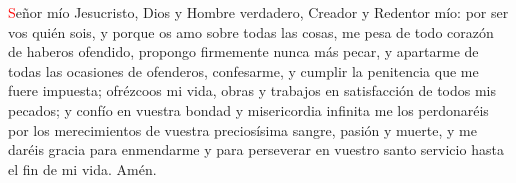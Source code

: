 \textcolor{red}{S}eñor mío Jesucristo, Dios y Hombre verdadero, Creador y Redentor mío: por ser vos quién sois, y porque os amo sobre todas las cosas,
me pesa de todo corazón de haberos ofendido, propongo firmemente nunca más pecar, y apartarme de todas las ocasiones de ofenderos,
confesarme, y cumplir la penitencia que me fuere impuesta; ofrézcoos mi vida, obras y trabajos en satisfacción de todos mis pecados;
y confío en vuestra bondad y misericordia infinita me los perdonaréis por los merecimientos de vuestra preciosísima sangre, pasión y muerte,
y me daréis gracia para enmendarme y para perseverar en vuestro santo servicio hasta el fin de mi vida. Amén.